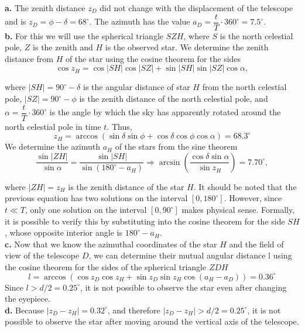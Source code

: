 \documentclass[a4paper,12pt]{extarticle}
\begin{document}
\begin{sol}
\textbf{a.} The zenith distance $z_D$ did not change with the displacement of the telescope and is $z_D = \phi - \delta = 68^\circ$. The azimuth has the value $a_D =\dfrac{t}{T} \cdot 360^\circ = 7.5^\circ$.	\\

\textbf{b.} For this we will use the spherical triangle $SZH$, where $S$ is the north celestial pole, $Z$ is the zenith and $H$ is the observed star. We determine the zenith distance from $H$ of the star using the cosine theorem for the sides
$$\cos z_H = \cos |SH| \cos |SZ| + \sin |SH| \sin |SZ| \cos \alpha,$$	

where $|SH| = 90^\circ -\delta$ is the angular distance of star $H$ from the north celestial pole, $|SZ| =90^\circ - \phi$ is the zenith distance of the north celestial pole, and $\alpha  =\dfrac{t}{T} \cdot 360^\circ$ is the angle by which the sky has apparently rotated around the north celestial pole in time $t$. Thus,
$$z_H = \arccos (\sin \delta \sin \phi + \cos \delta \cos \phi \cos \alpha)= 68.3^\circ $$
We determine the azimuth $a_H$ of the stars from the sine theorem
$$\frac{\sin|ZH|}{\sin\alpha}=\frac{\sin|SH|}{\sin(180^\circ -a_H)} \Rightarrow \arcsin \left(\frac{\cos\delta \sin\alpha }{\sin z_H}\right)=7.70^\circ,$$

where $|ZH| = z_H$ is the zenith distance of the star $H$. It should be noted that the previous equation has two solutions on the interval $[0, 180^\circ]$. However, since $t\ll T$, only one solution on the interval $[0, 90^\circ]$ makes physical sense. Formally, it is possible to verify this by substituting into the cosine theorem for the side $SH$, whose opposite interior angle is $180^\circ- a_H$.\\

\textbf{c.} Now that we know the azimuthal coordinates of the star $H$ and the field of view of the telescope $D$, we can determine their mutual angular distance l using the cosine theorem for the sides of the spherical triangle $ZDH$
$$l = \arccos (\cos z_D \cos z_H + \sin z_D \sin z_H \cos (a_H − a_D))= 0.36^\circ $$
Since $l > d/2 = 0.25^\circ$, it is not possible to observe the star even after changing the eyepiece.\\


\textbf{d.} Because $|z_D - z_H| = 0.32^\circ$, and therefore $|z_D - z_H| > d/2 = 0.25^\circ$, it is not possible to observe the star after moving around the vertical axis of the telescope.\\


\end{sol}
\end{document}
